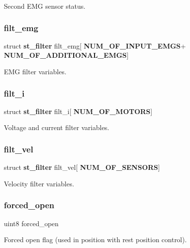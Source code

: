 Second E\+MG sensor status. \mbox{\label{globals_8h_aad3d2663356b48553e2b22e0a9fd917e}} 
\subsubsection{filt\+\_\+emg}
{\footnotesize\ttfamily struct \textbf{ st\+\_\+filter} filt\+\_\+emg[\textbf{ N\+U\+M\+\_\+\+O\+F\+\_\+\+I\+N\+P\+U\+T\+\_\+\+E\+M\+GS}+\textbf{ N\+U\+M\+\_\+\+O\+F\+\_\+\+A\+D\+D\+I\+T\+I\+O\+N\+A\+L\+\_\+\+E\+M\+GS}]}

E\+MG filter variables. \mbox{\label{globals_8h_ad09553d6780c43066a9ac4385658bcf1}} 
\subsubsection{filt\+\_\+i}
{\footnotesize\ttfamily struct \textbf{ st\+\_\+filter} filt\+\_\+i[\textbf{ N\+U\+M\+\_\+\+O\+F\+\_\+\+M\+O\+T\+O\+RS}]}

Voltage and current filter variables. \mbox{\label{globals_8h_af2dc9b0614aeaf7a377d209416bee61c}} 
\subsubsection{filt\+\_\+vel}
{\footnotesize\ttfamily struct \textbf{ st\+\_\+filter} filt\+\_\+vel[\textbf{ N\+U\+M\+\_\+\+O\+F\+\_\+\+S\+E\+N\+S\+O\+RS}]}

Velocity filter variables. \mbox{\label{globals_8h_a0f13b80a0c329fa3176eb1e72ef36fb8}} 
\subsubsection{forced\+\_\+open}
{\footnotesize\ttfamily uint8 forced\+\_\+open}

Forced open flag (used in position with rest position control). \mbox{\label{globals_8h_a85e15a194417ebcd15f662bd9bcfdded}} 

